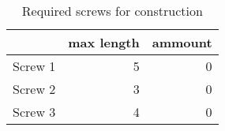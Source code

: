 \begin{table}[h!]
\centering
\caption{Required screws for construction}
\begin{tabular}{lrr}
\toprule
{} &  max length &  ammount \\
\midrule
Screw 1 &           5 &        0 \\
Screw 2 &           3 &        0 \\
Screw 3 &           4 &        0 \\
\bottomrule
\end{tabular}
\end{table}
